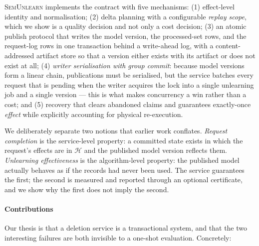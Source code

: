 \documentclass[conference]{IEEEtran}
\newcommand{\sys}{\textsc{SemUnlearn}}
\newcommand{\Hset}{\mathcal{H}}
\begin{document}
\sys{} implements the contract with five mechanisms: (1) effect-level identity and
normalisation; (2) delta planning with a configurable \emph{replay scope}, which we
show is a quality decision and not only a cost decision; (3) an atomic publish
protocol that writes the model version, the processed-set rows, and the request-log
rows in one transaction behind a write-ahead log, with a content-addressed artifact
store so that a version either exists with its artifact or does not exist at all;
(4) \emph{writer serialisation with group commit}: because model versions form a
linear chain, publications must be serialised, but the service batches every request
that is pending when the writer acquires the lock into a single unlearning job and a
single version --- this is what makes concurrency a win rather than a cost; and (5)
recovery that clears abandoned claims and guarantees exactly-once \emph{effect} while
explicitly accounting for physical re-execution.

We deliberately separate two notions that earlier work conflates.  \emph{Request
completion} is the service-level property: a committed state exists in which the
request's effects are in $\Hset$ and the published model version reflects them.
\emph{Unlearning effectiveness} is the algorithm-level property: the published
model actually behaves as if the records had never been used.  The service
guarantees the first; the second is measured and reported through an optional
certificate, and we show why the first does not imply the second.

\paragraph{Contributions}
Our thesis is that a deletion service is a transactional system, and that the two
interesting failures are both invisible to a one-shot evaluation.  Concretely:
\end{document}
